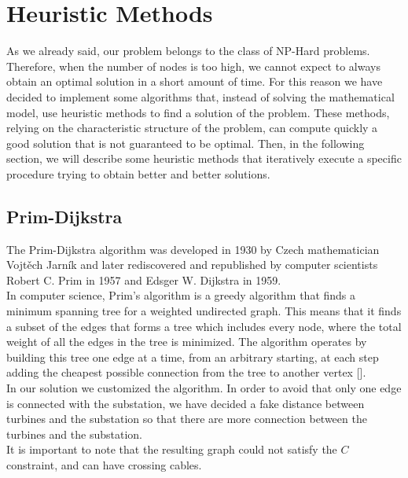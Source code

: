 
\chapter{Heuristic Methods}
\label{chp:5-Heuristic}
As we already said, our problem belongs to the class of NP-Hard problems. Therefore, when the number of nodes is too high, we cannot expect to always obtain an optimal solution in a short amount of time.
For this reason we have decided to implement some algorithms that, instead of solving the mathematical model, use heuristic methods to find a solution of the problem. These methods, relying on the characteristic structure of the problem,  can compute  quickly a good solution that is not guaranteed to be optimal.
Then, in the following section, we will describe some heuristic methods that iteratively execute a specific procedure trying to obtain better and better solutions.
\section{Prim-Dijkstra}
The Prim-Dijkstra algorithm was developed in 1930 by Czech mathematician Vojtěch Jarník and later rediscovered and republished by computer scientists Robert C. Prim in 1957 and Edsger W. Dijkstra in 1959.\\
In computer science, Prim's algorithm is a greedy algorithm that finds a minimum spanning tree for a weighted undirected graph. This means that it finds a subset of the edges that forms a tree which includes every node, where the total weight of all the edges in the tree is minimized. The algorithm operates by building this tree one edge at a time, from an arbitrary starting, at each step adding the cheapest possible connection from the tree to another vertex [\cite{cheriton1976finding}].\\
In our solution we customized the algorithm. In order to avoid that only one edge is connected with the substation, we have decided a fake distance between turbines and the substation so that there are more connection between the turbines and the substation.\\
It is important to note that the resulting graph could not satisfy the $C$ constraint, and can have crossing cables. 

